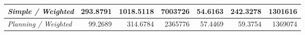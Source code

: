 \begin{table}[htb!]
\begin{tabular}{|l|r|r|r|r|r|r|}
\textit{Simple / Weighted}        & 293.8791                          & 1018.5118                           &  7003726                          & \cellcolor[HTML]{67FD9A}54.6163 & 242.3278                          & \cellcolor[HTML]{67FD9A}1301616 \\ \hline
\textit{Planning / Weighted}      &  99.2689                          &  314.6784                           &  2365776                          & 57.4469                         &  59.3754                          & 1369074                         \\ \hline
\end{tabular}
\end{table}